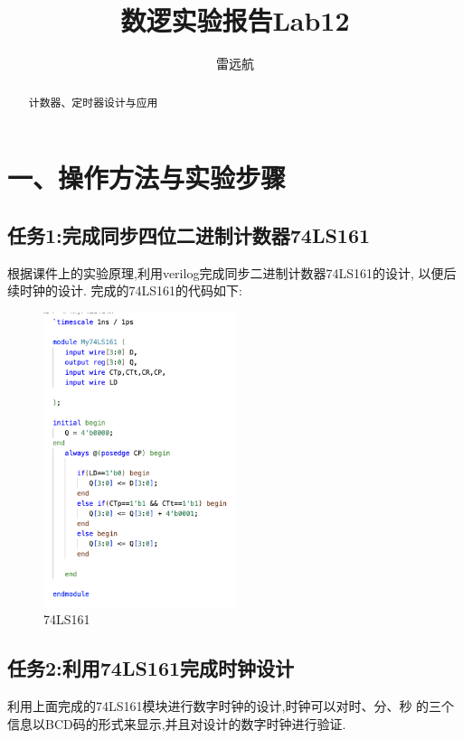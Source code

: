 \documentclass{article}
\title{数逻实验报告Lab12}
\author{雷远航}
\begin{document}
\maketitle

\begin{abstract}
    计数器、定时器设计与应用
\end{abstract}

\section*{一、操作方法与实验步骤}
\subsection*{任务1:完成同步四位二进制计数器74LS161}
根据课件上的实验原理,利用verilog完成同步二进制计数器74LS161的设计,
以便后续时钟的设计.
完成的74LS161的代码如下:
\begin{figure}[H]
    \centering
    \includegraphics[width=0.5\textwidth]{1.png}
    \caption{\label{Lab12}74LS161}
    \end{figure}


\subsection*{任务2:利用74LS161完成时钟设计}

利用上面完成的74LS161模块进行数字时钟的设计,时钟可以对时、分、秒
的三个信息以BCD码的形式来显示,并且对设计的数字时钟进行验证.
\end{document}
